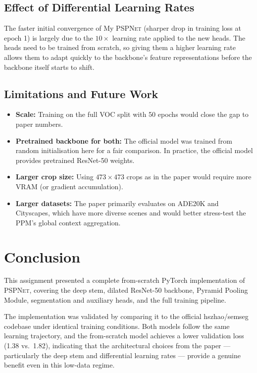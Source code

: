 \documentclass[12pt,a4paper]{article}
\newcommand{\pspnet}{\textsc{PSPNet}}
\newcommand{\mypsp}{My \pspnet{}}
\begin{document}
\subsection{Effect of Differential Learning Rates}

The faster initial convergence of \mypsp{} (sharper drop in training loss at
epoch 1) is largely due to the $10\times$ learning rate applied to the new
heads.  The heads need to be trained from scratch, so giving them a higher
learning rate allows them to adapt quickly to the backbone's feature
representations before the backbone itself starts to shift.

\subsection{Limitations and Future Work}

\begin{itemize}
    \item \textbf{Scale:} Training on the full VOC split with 50 epochs would
          close the gap to paper numbers.
    \item \textbf{Pretrained backbone for both:} The official model was trained
          from random initialisation here for a fair comparison.  In practice,
          the official model provides pretrained ResNet-50 weights.
    \item \textbf{Larger crop size:} Using $473\times473$ crops as in the paper
          would require more VRAM (or gradient accumulation).
    \item \textbf{Larger datasets:} The paper primarily evaluates on ADE20K and
          Cityscapes, which have more diverse scenes and would better stress-test
          the PPM's global context aggregation.
\end{itemize}

\section{Conclusion}

This assignment presented a complete from-scratch PyTorch implementation of
\pspnet{}, covering the deep stem, dilated ResNet-50 backbone, Pyramid Pooling
Module, segmentation and auxiliary heads, and the full training pipeline.

The implementation was validated by comparing it to the official hszhao/semseg
codebase under identical training conditions.  Both models follow the same
learning trajectory, and the from-scratch model achieves a lower validation
loss (1.38 vs.\ 1.82), indicating that the architectural choices from the
paper — particularly the deep stem and differential learning rates — provide a
genuine benefit even in this low-data regime.
\end{document}
